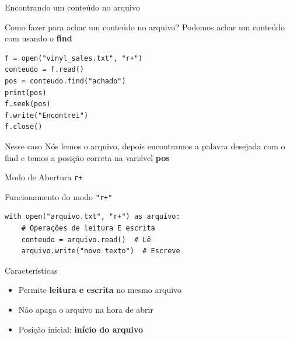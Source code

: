 \begin{frame}[fragile]{Encontrando um conteúdo no arquivo}
    \begin{block}{Como fazer para achar um conteúdo no arquivo?}
        Podemos achar um conteúdo com usando o \textbf{find}
    \end{block}
    \begin{verbatim}
f = open("vinyl_sales.txt", "r+")
conteudo = f.read()
pos = conteudo.find("achado")
print(pos)
f.seek(pos)
f.write("Encontrei")
f.close()
    \end{verbatim}

    \begin{alertblock}{Nesse caso}
        Nós lemos o arquivo, depois encontramos a palavra desejada com o find e temos a posição correta na variável \textbf{pos}
    \end{alertblock}

\end{frame}


\begin{frame}[fragile]{Modo de Abertura \texttt{r+}}

    \begin{block}{Funcionamento do modo \texttt{"r+"}}
        \begin{verbatim}
with open("arquivo.txt", "r+") as arquivo:
    # Operações de leitura E escrita
    conteudo = arquivo.read()  # Lê
    arquivo.write("novo texto")  # Escreve
\end{verbatim}
    \end{block}

    \begin{alertblock}{Características}
        \begin{itemize}
            \item Permite \textbf{leitura e escrita} no mesmo arquivo
            \item Não apaga o arquivo na hora de abrir
            \item Posição inicial: \textbf{início do arquivo}
        \end{itemize}
    \end{alertblock}

\end{frame}

